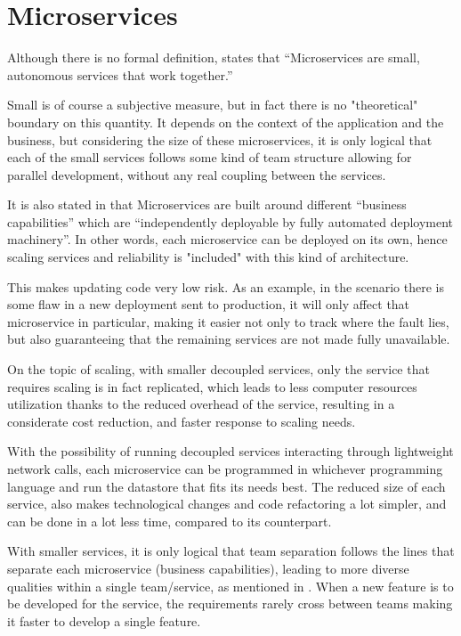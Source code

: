 \section{Microservices}

Although there is no formal definition, \cite[Chapter~1]{newman2015building} states that ``Microservices are small, autonomous services that work together.''

Small is of course a subjective measure, but in fact there is no "theoretical" boundary on this quantity. It depends on the context of the application and the business, but considering the size of these microservices, it is only logical that each of the small services follows some kind of team structure allowing for parallel development, without any real coupling between the services. 

It is also stated in \cite{MartinFowlerMicroservices} that Microservices are built around different ``business capabilities'' which are ``independently deployable by fully automated deployment machinery''. In other words, each microservice can be deployed on its own, hence scaling services and reliability is "included" with this kind of architecture. 

This makes updating code very low risk. As an example, in the scenario there is some flaw in a new deployment sent to production, it will only affect that microservice in particular, making it easier not only to track where the fault lies, but also guaranteeing that the remaining services are not made fully unavailable.

On the topic of scaling, with smaller decoupled services, only the service that requires scaling is in fact replicated, which leads to less computer resources utilization thanks to the reduced overhead of the service, resulting in a considerate cost reduction, and faster response to scaling needs.

With the possibility of running decoupled services interacting through lightweight network calls, each microservice can be programmed in whichever programming language and run the datastore that fits its needs best. The reduced size of each service, also makes technological changes and code refactoring a lot simpler, and can be done in a lot less time, compared to its counterpart.

With smaller services, it is only logical that team separation follows the lines that separate each microservice (business capabilities), leading to more diverse qualities within a single team/service, as mentioned in \cite{MartinFowlerMicroservices}. When a new feature is to be developed for the service, the requirements rarely cross between teams making it faster to develop a single feature.

